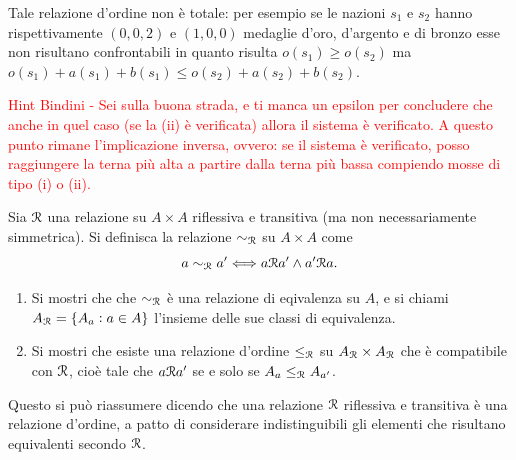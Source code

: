 \documentclass[a4paper]{article}\par \usepackage{style}\par
\begin{document}
Tale relazione d'ordine non è totale: per esempio se le nazioni $ s_1 $ e $ s_2 $ hanno rispettivamente $ (0, 0, 2) $ e $ (1, 0, 0) $ medaglie d'oro, d'argento e di bronzo esse non risultano confrontabili in quanto risulta $ o(s_1) \geq o(s_2) $ ma $ o(s_1) + a(s_1) + b(s_1) \leq o(s_2) + a(s_2) + b(s_2) $.\\\par \textcolor{red}{Hint Bindini - Sei sulla buona strada, e ti manca un epsilon per concludere che anche in quel caso (se la (ii) è verificata) allora il sistema è verificato. A questo punto rimane l'implicazione inversa, ovvero: se il sistema è verificato, posso raggiungere la terna più alta a partire dalla terna più bassa compiendo mosse di tipo (i) o (ii).}\par \begin{es}
  Sia $ \mathcal{R} $ una relazione su $ A \times A $ riflessiva e transitiva (ma non necessariamente simmetrica). Si definisca la relazione $ \sim_{\mathcal{R}}  $ su $ A \times A $ come \[a \sim_{\mathcal{R}} a' \Longleftrightarrow a \mathcal{R} a' \wedge a' \mathcal{R} a.\]
  \begin{enumerate}
  \item Si mostri che che $ \sim_{\mathcal{R}} $ è una relazione di eqivalenza su $ A $, e si chiami $ A_{\mathcal{R}} = \{A_a : a \in A\} $ l'insieme delle sue classi di equivalenza.
  \item Si mostri che esiste una relazione d'ordine $ \leq_{\mathcal{R}} $ su $ A_{\mathcal{R}} \times A_{\mathcal{R}} $ che è compatibile con $ \mathcal{R} $, cioè tale che $ a \mathcal{R} a' $ se e solo se $ A_a \leq_{\mathcal{R}} A_{a'} $.
  \end{enumerate}
  Questo si può riassumere dicendo che una relazione $ \mathcal{R} $ riflessiva e transitiva è una relazione d'ordine, a patto di considerare indistinguibili gli elementi che risultano equivalenti secondo $ \mathcal{R} $.
\end{es}
\end{document}
